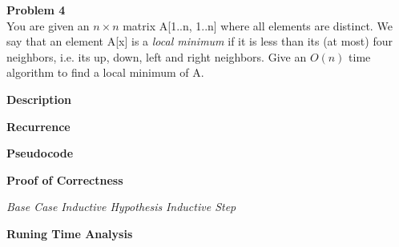 \documentclass[12pt,article]{article}
\newenvironment{problem}[2][Problem]
    { \begin{mdframed}[backgroundcolor=gray!20] \textbf{#1 #2} \\}
    {  \end{mdframed}}
\begin{document}
\newpage
\begin{problem}{4} 
You are given an $n \times n$ matrix A[1..n, 1..n] where all elements are distinct. We say that an element A[x] is a \textit{local minimum} if it is less than its (at most) four neighbors, i.e. its up, down, left and right neighbors. Give an $O(n)$ time algorithm to find a local minimum of A.
\end{problem}

\textbf{Description}

\textbf{Recurrence}


\textbf{Pseudocode}


\textbf{Proof of Correctness}

\textit{Base Case}
\textit{Inductive Hypothesis}
\textit{Inductive Step}

\textbf{Runing Time Analysis}



\end{document}
